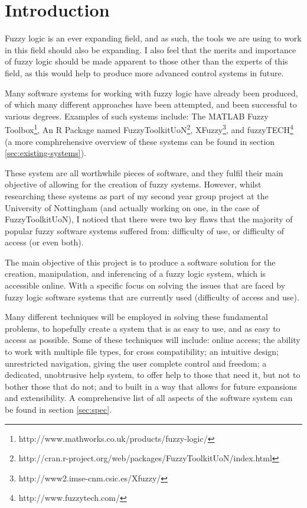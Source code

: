 \section{Introduction}
Fuzzy logic is an ever expanding field, and as such, the tools we are using to work in this field should also be expanding. I also feel that the merits and importance of fuzzy logic should be made apparent to those other than the experts of this field, as this would help to produce more advanced control systems in future.

Many software systems for working with fuzzy logic have already been produced, of which many different approaches have been attempted, and been successful to various degrees. Examples of such systems include: The MATLAB Fuzzy Toolbox\footnote{http://www.mathworks.co.uk/products/fuzzy-logic/}, An R Package named  FuzzyToolkitUoN\footnote{http://cran.r-project.org/web/packages/FuzzyToolkitUoN/index.html}, XFuzzy\footnote{http://www2.imse-cnm.csic.es/Xfuzzy/}, and fuzzyTECH\footnote{http://www.fuzzytech.com/} (a more comphrehensive overview of these systems can be found in section \ref{sec:existing-systems}).

These system are all worthwhile pieces of software, and they fulfil their main objective of allowing for the creation of fuzzy systems. However, whilst researching these systems as part of my second year group project at the University of Nottingham (and actually working on one, in the case of FuzzyToolkitUoN), I noticed that there were two key flaws that the majority of popular fuzzy software systems suffered from: difficulty of use, or difficulty of access (or even both). 


The main objective of this project is to produce a software solution for the creation, manipulation, and inferencing of a fuzzy logic system, which is accessible online. With a specific focus on solving the issues that are faced by fuzzy logic software systems that are currently used (difficulty of access and use). 

Many different techniques will be employed in solving these fundamental problems, to hopefully create a system that is as easy to use, and as easy to access as possible. Some of these techniques will include: online access; the ability to work with multiple file types, for cross compatibility; an intuitive design; unrestricted navigation, giving the user complete control and freedom; a dedicated, unobtrusive help system, to offer help to those that need it, but not to bother those that do not; and to built in a way that allows for future expansions and extensibility. A comprehensive list of all aspects of the software system can be found in section \ref{sec:spec}.

